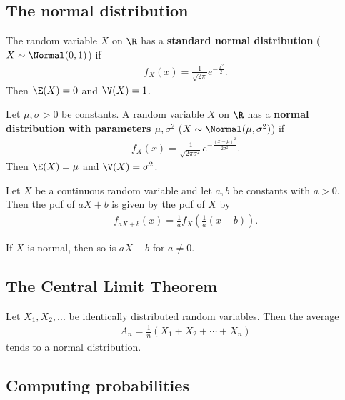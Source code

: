 \documentclass{article}
\begin{document}
\subsection{The normal distribution}
\begin{definition}
    The random variable $X$ on $\R$ has a \textbf{standard normal distribution}
    ($X\sim\Normal(0,1)$) if 
    \begin{align*}
        f_X(x)=\frac{1}{\sqrt{2\pi}}e^{-\frac{x^2}{2}}.
    \end{align*}
    Then $\E(X)=0$ and $\V(X)=1$.
\end{definition}
\begin{definition}
    Let $\mu,\sigma>0$ be constants. A random variable $X$ on $\R$ has
    a \textbf{normal distribution with parameters $\mu,\sigma^2$}
    ($X\sim\Normal(\mu,\sigma^2)$) if
    \begin{align*}
        f_X(x) =\frac{1}{\sqrt{2\pi\sigma^2}}e^{-\frac{(x-\mu)^2}{2\sigma^2 }}.
    \end{align*}
    Then $\E(X)=\mu$ and $\V(X)=\sigma^2$.
\end{definition}
\begin{proposition}
    Let $X$ be a continuous random variable and let $a,b$ be constants
    with $a>0$. Then the pdf of $aX+b$ is given by the pdf of $X$ by
    \begin{align*}
        f_{aX+b}(x)=\frac{1}{a}f_X\left(\frac{1}{a}(x-b)\right).
    \end{align*}
\end{proposition}
\begin{theorem}
       If $X$ is normal, then so is $aX+b$ for $a\not=0$.
\end{theorem}


\subsection{The Central Limit Theorem}


\begin{theorem}
    Let $X_1,X_2,...$ be identically distributed random variables.
    Then the average
    \begin{align*}
        A_n=\frac{1}{n}\left(X_1+X_2+\cdots+X_n\right)
    \end{align*}
    tends to a normal distribution.
\end{theorem}


\subsection{Computing probabilities}
\end{document}
